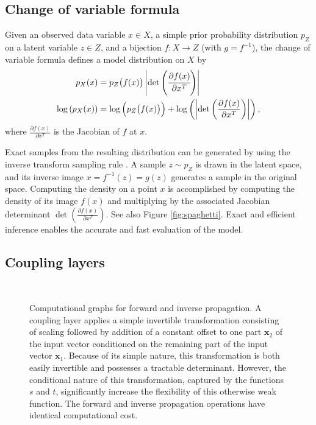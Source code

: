 \documentclass{article}
\newcommand{\mb}{\mathbf}
\begin{document}
\subsection{Change of variable formula}
Given an observed data variable $x \in X$,
a simple prior probability distribution $p_{Z}$ on a latent variable $z \in Z$,
and a bijection $f: X \rightarrow Z$ (with $g = f^{-1}$),
the change of variable formula defines a model distribution on $X$ by
\begin{align}
p_{X}(x) &= p_{Z}\big(f(x)\big) \left|\det\left(\cfrac{\partial f(x)}{\partial x^T} \right)\right|
\label{eq:change-variables}\\
\log\left(p_{X}(x)\right) &= \log\Big(p_{Z}\big(f(x)\big)\Big) + \log\left(\left|\det\left(\frac{\partial f(x)}{\partial x^T}\right)\right|\right)
,
\end{align}
where $\frac{\partial f(x)}{\partial x^T}$ is the Jacobian of $f$ at $x$.

Exact samples from the resulting distribution can be generated by using the inverse transform sampling rule \citep{devroye1986sample}. A sample $z \sim p_{Z}$ is drawn in the latent space, and its inverse image $x = f^{-1}(z) = g(z)$ generates a sample in the original space. Computing the density on a point $x$ is accomplished by computing the density of its image $f(x)$ and multiplying by the associated Jacobian determinant $\det\left(\frac{\partial f(x)}{\partial x^T}\right)$. See also Figure \ref{fig:spaghetti}. Exact and efficient inference enables the accurate and fast evaluation of the model.






\subsection{Coupling layers}
\begin{figure}
\centering
     ~~~~~~
    \caption{Computational graphs for forward and inverse propagation. A coupling layer applies a simple invertible transformation consisting of scaling followed by addition of a constant offset to one part $\mb x_{2}$ of the input vector conditioned on the remaining part of the input vector $\mb x_{1}$. Because of its simple nature, this transformation is both easily invertible and possesses a tractable determinant.
    However, the conditional nature of this transformation, captured by the functions $s$ and $t$, significantly increase the flexibility of this otherwise weak function.
	The forward and inverse propagation operations have identical computational cost. }
\end{figure}
\end{document}
